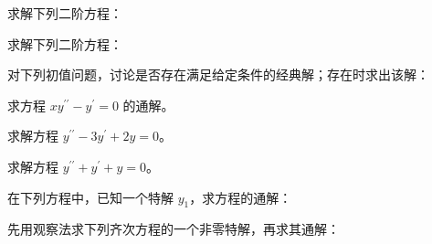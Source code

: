 \newpage
\noindent\begin{minipage}{\textwidth}
求解下列二阶方程：
\end{minipage}\par\vfill
\noindent\begin{minipage}{\textwidth}
求解下列二阶方程：
\end{minipage}\par\vfill
\noindent\begin{minipage}{\textwidth}
对下列初值问题，讨论是否存在满足给定条件的经典解；存在时求出该解：
\end{minipage}\par\vfill
\noindent\begin{minipage}{\textwidth}
求方程 $xy^{\prime\prime}-y^{\prime}=0$ 的通解。
\end{minipage}\par\vfill
\newpage
\noindent\begin{minipage}{\textwidth}
求解方程 $y^{\prime\prime}-3y^{\prime}+2y=0$。
\end{minipage}\par\vfill
\noindent\begin{minipage}{\textwidth}
求解方程 $y^{\prime\prime}+y^{\prime}+y=0$。
\end{minipage}\par\vfill
\noindent\begin{minipage}{\textwidth}
在下列方程中，已知一个特解 $y_1$，求方程的通解：
\end{minipage}\par\vfill
\noindent\begin{minipage}{\textwidth}
先用观察法求下列齐次方程的一个非零特解，再求其通解：
\end{minipage}\par\vfill
